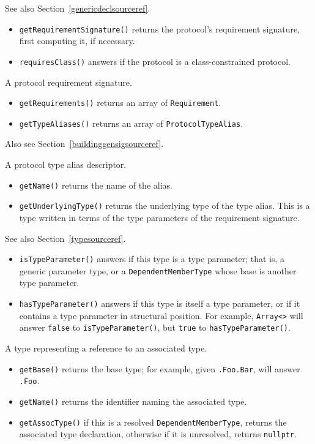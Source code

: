 \documentclass[../generics]{subfiles}
\begin{document}
See also Section~\ref{genericdeclsourceref}.
\begin{itemize}
\item \texttt{getRequirementSignature()} returns the protocol's requirement signature, first computing it, if necessary.
\item \texttt{requiresClass()} answers if the protocol is a class-constrained protocol.
\end{itemize}

A protocol requirement signature.
\begin{itemize}
\item \texttt{getRequirements()} returns an array of \texttt{Requirement}.
\item \texttt{getTypeAliases()} returns an array of \texttt{ProtocolTypeAlias}.
\end{itemize}
Also see Section~\ref{buildinggensigsourceref}.

A protocol type alias descriptor.
\begin{itemize}
\item \texttt{getName()} returns the name of the alias.
\item \texttt{getUnderlyingType()} returns the underlying type of the type alias. This is a type written in terms of the type parameters of the requirement signature.
\end{itemize}

See also Section~\ref{typesourceref}.
\begin{itemize}
\item \texttt{isTypeParameter()} answers if this type is a type parameter; that is, a generic parameter type, or a \texttt{DependentMemberType} whose base is another type parameter.
\item \texttt{hasTypeParameter()} answers if this type is itself a type parameter, or if it contains a type parameter in structural position. For example, \texttt{Array<>} will answer \texttt{false} to \texttt{isTypeParameter()}, but \texttt{true} to \texttt{hasTypeParameter()}. 
\end{itemize}

A type representing a reference to an associated type.
\begin{itemize}
\item \texttt{getBase()} returns the base type; for example, given \texttt{.Foo.Bar}, will answer \texttt{.Foo}.
\item \texttt{getName()} returns the identifier naming the associated type.
\item \texttt{getAssocType()} if this is a resolved \texttt{DependentMemberType}, returns the associated type declaration, otherwise if it is unresolved, returns \texttt{nullptr}.
\end{itemize}
\end{document}
